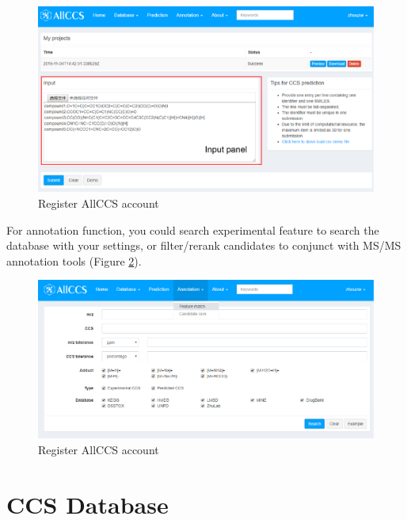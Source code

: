 \documentclass[12pt,]{book}
\theoremstyle{definition}
\theoremstyle{definition}
\theoremstyle{definition}
\theoremstyle{remark}
\begin{document}
\begin{figure}

{\centering \includegraphics{images/chapter1/prediction} 

}

\caption{Register AllCCS account}\label{fig:FigPrediction}
\end{figure}

For annotation function, you could search experimental feature to search
the database with your settings, or filter/rerank candidates to conjunct
with MS/MS annotation tools (Figure \ref{fig:FigMatch}).

\begin{figure}

{\centering \includegraphics{images/chapter1/match} 

}

\caption{Register AllCCS account}\label{fig:FigMatch}
\end{figure}

\chapter{CCS Database}\label{ccsdb}
\end{document}
